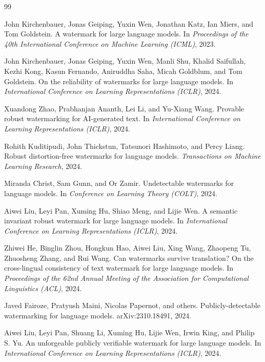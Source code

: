 \documentclass[11pt]{article}
\theoremstyle{definition}
\newcommand{\1}{\mathbf{1}}
\begin{document}
\begin{thebibliography}{99}

John Kirchenbauer, Jonas Geiping, Yuxin Wen, Jonathan Katz, Ian Miers, and Tom Goldstein.
\newblock A watermark for large language models.
\newblock In \emph{Proceedings of the 40th International Conference on Machine Learning (ICML)}, 2023.

John Kirchenbauer, Jonas Geiping, Yuxin Wen, Manli Shu, Khalid Saifullah, Kezhi Kong, Kasun Fernando, Aniruddha Saha, Micah Goldblum, and Tom Goldstein.
\newblock On the reliability of watermarks for large language models.
\newblock In \emph{International Conference on Learning Representations (ICLR)}, 2024.

Xuandong Zhao, Prabhanjan Ananth, Lei Li, and Yu-Xiang Wang.
\newblock Provable robust watermarking for AI-generated text.
\newblock In \emph{International Conference on Learning Representations (ICLR)}, 2024.

Rohith Kuditipudi, John Thickstun, Tatsunori Hashimoto, and Percy Liang.
\newblock Robust distortion-free watermarks for language models.
\newblock \emph{Transactions on Machine Learning Research}, 2024.

Miranda Christ, Sam Gunn, and Or Zamir.
\newblock Undetectable watermarks for language models.
\newblock In \emph{Conference on Learning Theory (COLT)}, 2024.

Aiwei Liu, Leyi Pan, Xuming Hu, Shiao Meng, and Lijie Wen.
\newblock A semantic invariant robust watermark for large language models.
\newblock In \emph{International Conference on Learning Representations (ICLR)}, 2024.

Zhiwei He, Binglin Zhou, Hongkun Hao, Aiwei Liu, Xing Wang, Zhaopeng Tu, Zhuosheng Zhang, and Rui Wang.
\newblock Can watermarks survive translation? On the cross-lingual consistency of text watermark for large language models.
\newblock In \emph{Proceedings of the 62nd Annual Meeting of the Association for Computational Linguistics (ACL)}, 2024.

Javed Fairoze, Pratyush Maini, Nicolas Papernot, and others.
\newblock Publicly-detectable watermarking for language models.
\newblock arXiv:2310.18491, 2024.

Aiwei Liu, Leyi Pan, Shuang Li, Xuming Hu, Lijie Wen, Irwin King, and Philip S. Yu.
\newblock An unforgeable publicly verifiable watermark for large language models.
\newblock In \emph{International Conference on Learning Representations (ICLR)}, 2024.


\end{thebibliography}
\end{document}
